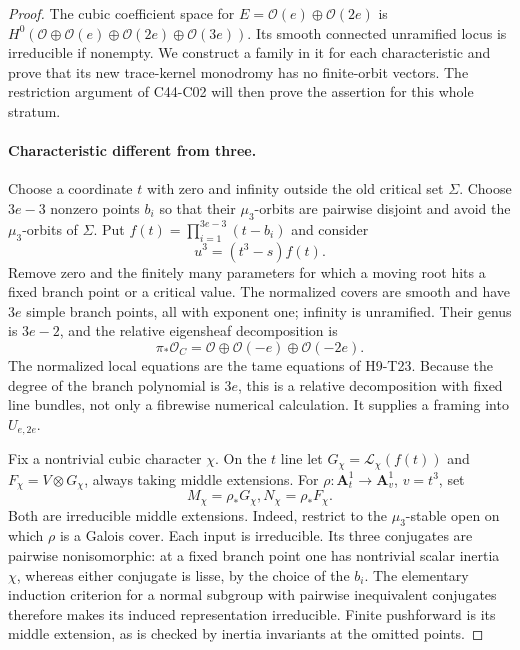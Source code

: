 \documentclass[11pt]{article}
\theoremstyle{remark}\newtheorem{remark}[theorem]{Remark}
\begin{document}
\begin{proof}
The cubic coefficient space for $E=\mathcal O(e)\oplus\mathcal O(2e)$
is $H^0(\mathcal O\oplus\mathcal O(e)\oplus\mathcal O(2e)
\oplus\mathcal O(3e))$. Its smooth connected unramified locus is
irreducible if nonempty. We construct a family in it for each
characteristic and prove that its new trace-kernel monodromy has
no finite-orbit vectors. The restriction argument of C44-C02
will then prove the assertion for this whole stratum.

\paragraph{Characteristic different from three.}
Choose a coordinate $t$ with zero and infinity outside the old critical
set $\Sigma$. Choose $3e-3$ nonzero points $b_i$ so that their
$\mu_3$-orbits are pairwise disjoint and avoid the $\mu_3$-orbits of
$\Sigma$. Put $f(t)=\prod_{i=1}^{3e-3}(t-b_i)$ and consider
\[
                   u^3=(t^3-s)f(t).
 \tag{C44.C04.1}
\]
Remove zero and the finitely many parameters for which a moving root
hits a fixed branch point or a critical value. The normalized covers
are smooth and have $3e$ simple branch points, all with exponent one;
infinity is unramified. Their genus is $3e-2$, and the relative
eigensheaf decomposition is
\[
        \pi_*\mathcal O_C=
        \mathcal O\oplus\mathcal O(-e)\oplus\mathcal O(-2e).
 \tag{C44.C04.2}
\]
The normalized local equations are the tame equations of H9-T23.
Because the degree of the branch polynomial is $3e$, this is a
relative decomposition with fixed line bundles, not only a
fibrewise numerical calculation. It supplies a framing into $U_{e,2e}$.

Fix a nontrivial cubic character $\chi$. On the $t$ line let
$G_\chi=\mathcal L_\chi(f(t))$ and
$F_\chi=V\otimes G_\chi$, always taking middle extensions.
For $\rho:\mathbf A^1_t\to\mathbf A^1_v$, $v=t^3$, set
\[
                  M_\chi=\rho_*G_\chi,
                  N_\chi=\rho_*F_\chi.
\]
Both are irreducible middle extensions. Indeed, restrict to the
$\mu_3$-stable open on which $\rho$ is a Galois cover. Each input
is irreducible. Its three conjugates are pairwise nonisomorphic:
at a fixed branch point one has nontrivial scalar inertia $\chi$,
whereas either conjugate is lisse, by the choice of the $b_i$.
The elementary induction criterion for a normal subgroup with
pairwise inequivalent conjugates therefore makes its induced
representation irreducible. Finite pushforward is its middle
extension, as is checked by inertia invariants at the omitted points.


\end{proof}
\end{document}
